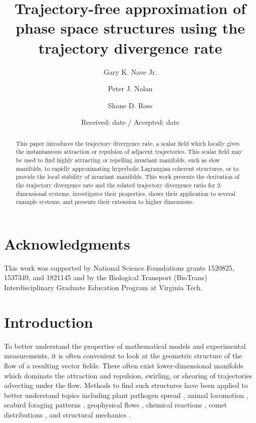\documentclass[twocolumn]{svjour3}
\begin{document}
\title{Trajectory-free approximation of phase space structures using the trajectory divergence rate}
\author{Gary K. Nave Jr. \and
	Peter J. Nolan \and
	Shane D. Ross}


\date{Received: date / Accepted: date}
\maketitle
\begin{abstract}
	This paper introduces the trajectory divergence rate, a scalar field which locally gives the instantaneous attraction or repulsion of adjacent trajectories. This scalar field may be used to find highly attracting or repelling invariant manifolds, such as slow manifolds, to rapidly approximating hyperbolic Lagrangian coherent structures, or to provide the local stability of invariant manifolds. This work presents the derivation of the trajectory divergence rate and the related trajectory divergence ratio for 2-dimensional systems, investigates their properties, shows their application to several example systems, and presents their extension to higher dimensions.
\end{abstract}

\section*{Acknowledgments}
This work was supported by National Science Foundations grants 1520825, 1537349, and 1821145 and by the Biological Transport (BioTrans) Interdisciplinary Graduate Education Program at Virginia Tech.

\section{Introduction}

To better understand the properties of mathematical models and experimental measurements, it is often convenient to look at the geometric structure of the flow of a resulting vector fields. There often exist lower-dimensional manifolds which dominate the attraction and repulsion, swirling, or shearing of trajectories advecting under the flow. Methods to find such structures have been applied to better understand topics including plant pathogen spread \cite{schmale2015highways}, animal locomotion \cite{peng2008theupstream,nave2018global}, seabird foraging patterns \cite{kai2009top}, geophysical flows \cite{lekien2005pollution,wiggins2005dynamical}, chemical reactions \cite{zhong2017tube}, comet distributions \cite{zhong2017tube}, and structural mechanics \cite{zhong2017tube}.
\end{document}

